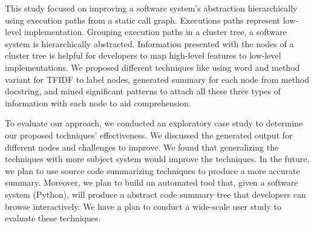 This study focused on improving a software system's abstraction hierarchically using execution paths from a static call graph. Executions paths represent low-level implementation. Grouping execution paths in a cluster tree, a software system is hierarchically abstracted. Information presented with the nodes of a cluster tree is helpful for developers to map high-level features to low-level implementations. We proposed different techniques like using word and method variant for TFIDF to label nodes, generated summary for each node from method docstring, and mined significant patterns to attach all these three types of information with each node to aid comprehension.

To evaluate our approach, we conducted an exploratory case study to determine our proposed techniques' effectiveness. We discussed the generated output for different nodes and challenges to improve. We found that generalizing the techniques with more subject system would improve the techniques. In the future, we plan to use source code summarizing techniques \cite{wan2018improvingCodeSummary, ahmad2020transformerCodeSummary, zhu2019automaticSummaryReview} to produce a more accurate summary. Moreover, we plan to build an automated tool that, given a software system (Python), will produce a abstract code summary tree that developers can browse interactively. We have a plan to conduct a wide-scale user study to evaluate these techniques.
